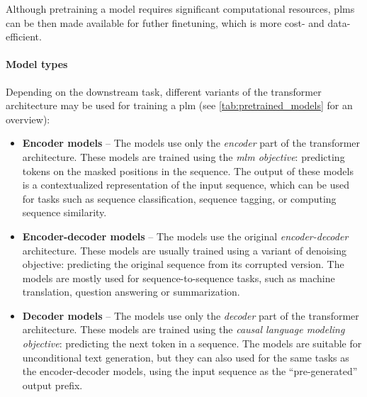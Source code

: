 Although pretraining a model requires significant computational resources, \acp{plm} can be then made available for futher finetuning, which is more cost- and data- efficient.


\paragraph{Model types} Depending on the downstream task, different variants of the transformer architecture may be used for training a \ac{plm} (see \autoref{tab:pretrained_models} for an overview):

\begin{itemize}
    \item \textbf{Encoder models} -- The models use only the \emph{encoder} part of the transformer architecture. These models are trained using the \emph{\ac{mlm} objective}: predicting tokens on the masked positions in the sequence. The output of these models is a contextualized representation of the input sequence, which can be used for tasks such as sequence classification, sequence tagging, or computing sequence similarity.
    \item \textbf{Encoder-decoder models} -- The models use the original \emph{encoder-decoder} architecture. These models are usually trained using a variant of denoising objective: predicting the original sequence from its corrupted version. The models are mostly used for sequence-to-sequence tasks, such as machine translation, question answering or summarization.
    \item \textbf{Decoder models} -- The models use only the \emph{decoder} part of the transformer architecture. These models are trained using the \emph{causal language modeling objective}: predicting the next token in a sequence. The models are suitable for unconditional text generation, but they can also used for the same tasks as the encoder-decoder models, using the input sequence as the ``pre-generated'' output prefix.
\end{itemize}

